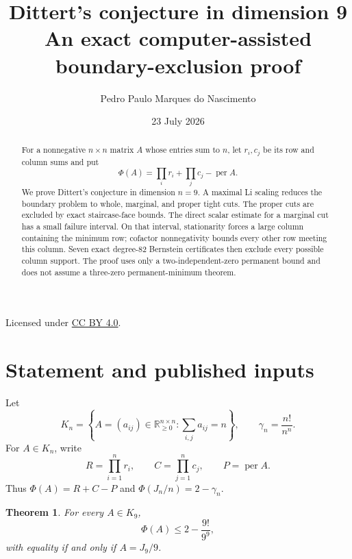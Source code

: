 \documentclass[11pt]{article}
\title{Dittert's conjecture in dimension 9\\
\large An exact computer-assisted boundary-exclusion proof}
\author{Pedro Paulo Marques do Nascimento}
\date{23 July 2026}
\newtheorem{theorem}{Theorem}[section]
\theoremstyle{remark}
\newcommand{\per}{\operatorname{per}}
\newcommand{\RR}{\mathbb R}
\begin{document}
\maketitle

\begin{center}

\small Licensed under \href{https://creativecommons.org/licenses/by/4.0/}{CC BY 4.0}.
\end{center}

\begin{abstract}
For a nonnegative $n\times n$ matrix $A$ whose entries sum to $n$, let $r_i,c_j$
be its row and column sums and put
\[
 \Phi(A)=\prod_i r_i+\prod_j c_j-\per A.
\]
We prove Dittert's conjecture in dimension $n=9$.  A maximal Li scaling
reduces the boundary problem to whole, marginal, and proper tight cuts.
The proper cuts are excluded by exact staircase-face bounds.  The direct
scalar estimate for a marginal cut has a small failure interval.  On that
interval, stationarity forces a large column containing the minimum row;
cofactor nonnegativity bounds every other row meeting this column.  Seven
exact degree-82 Bernstein certificates then exclude every possible column
support.  The proof uses only a two-independent-zero permanent bound and does
not assume a three-zero permanent-minimum theorem.
\end{abstract}

\section{Statement and published inputs}

Let
\[
 K_n=\left\{A=(a_{ij})\in\RR_{\ge0}^{n\times n}:
       \sum_{i,j}a_{ij}=n\right\},
 \qquad
 \gamma_n=\frac{n!}{n^n}.
\]
For $A\in K_n$, write
\[
 R=\prod_{i=1}^n r_i,\qquad
 C=\prod_{j=1}^n c_j,\qquad
 P=\per A.
\]
Thus $\Phi(A)=R+C-P$ and $\Phi(J_n/n)=2-\gamma_n$.

\begin{theorem}\label{thm:main}
For every $A\in K_9$,
\[
 \Phi(A)\le 2-\frac{9!}{9^9},
\]
with equality if and only if $A=J_9/9$.
\end{theorem}
\end{document}
